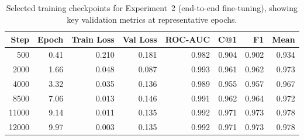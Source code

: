 \begin{table}[t]
\caption{Selected training checkpoints for Experiment~2 (end-to-end fine-tuning),
showing key validation metrics at representative epochs.}
\label{tab:training_steps_exp2}
\begin{tabular}{rrrrrrrr}
\toprule
\textbf{Step} & \textbf{Epoch} & \textbf{Train Loss} & \textbf{Val Loss} & \textbf{ROC-AUC} & \textbf{C@1} & \textbf{F1} & \textbf{Mean} \\
\midrule
500   & 0.41 & 0.210 & 0.181 & 0.982 & 0.904 & 0.902 & 0.934 \\
2000  & 1.66 & 0.048 & 0.087 & 0.993 & 0.961 & 0.962 & 0.973 \\
4000  & 3.32 & 0.035 & 0.136 & 0.989 & 0.955 & 0.957 & 0.967 \\
8500  & 7.06 & 0.013 & 0.146 & 0.991 & 0.962 & 0.964 & 0.972 \\
11000 & 9.14 & 0.011 & 0.135 & 0.992 & 0.971 & 0.973 & 0.978 \\
12000 & 9.97 & 0.003 & 0.135 & 0.992 & 0.971 & 0.973 & 0.978 \\
\bottomrule
\end{tabular}
\end{table}
